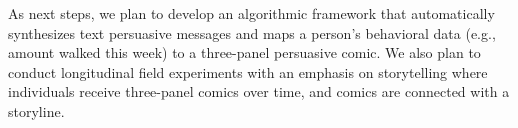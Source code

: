 As next steps, we plan to develop an algorithmic framework that automatically synthesizes text persuasive messages and maps a person's behavioral data (e.g., amount walked this week) to a three-panel persuasive comic. We also plan to conduct longitudinal field experiments with an emphasis on storytelling where individuals receive three-panel comics over time, and comics are connected with a storyline.







